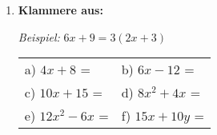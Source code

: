 \begin{enumerate}[label=\arabic*.]
    \vspace{1cm}

    \item \textbf{Klammere aus:}

    \textit{Beispiel:} $6x + 9 = 3(2x + 3)$

    \vspace{0.5cm}
    \begin{tabular}{ll}
        a) $4x + 8$ = \underline{\hspace{4cm}} & b) $6x - 12$ = \underline{\hspace{4cm}} \\[2ex]
        c) $10x + 15$ = \underline{\hspace{4cm}} & d) $8x^2 + 4x$ = \underline{\hspace{4cm}} \\[2ex]
        e) $12x^2 - 6x$ = \underline{\hspace{4cm}} & f) $15x + 10y$ = \underline{\hspace{4cm}}
    \end{tabular}

\end{enumerate}